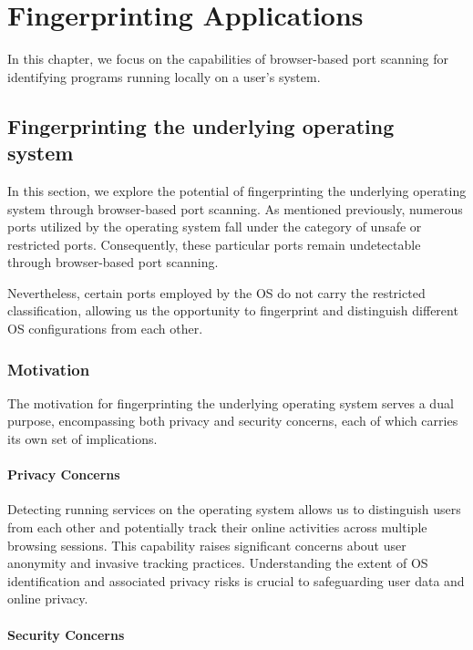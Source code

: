 \chapter{Fingerprinting Applications}

In this chapter, we focus on the capabilities of browser-based port scanning for identifying programs running locally on a user's system. 

\section{Fingerprinting the underlying operating system}

In this section, we explore the potential of fingerprinting the underlying operating system through browser-based port scanning. As mentioned previously, numerous ports utilized by the operating system fall under the category of unsafe or restricted ports. Consequently, these particular ports remain undetectable through browser-based port scanning.

Nevertheless, certain ports employed by the OS do not carry the restricted classification, allowing us the opportunity to fingerprint and distinguish different OS configurations from each other. 

\subsection{Motivation}

The motivation for fingerprinting the underlying operating system serves a dual purpose, encompassing both privacy and security concerns, each of which carries its own set of implications.

\subsubsection{Privacy Concerns}

Detecting running services on the operating system allows us to distinguish users from each other and potentially track their online activities across multiple browsing sessions. This capability raises significant concerns about user anonymity and invasive tracking practices. Understanding the extent of OS identification and associated privacy risks is crucial to safeguarding user data and online privacy.

\subsubsection{Security Concerns}


